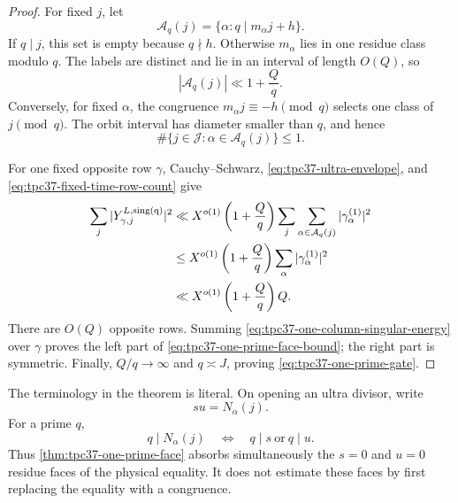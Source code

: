 \begin{proof}
For fixed \(j\), let
\begin{equation}
 \mathcal A_q(j)=\{\alpha:q\mid m_\alpha j+h\}.
 \label{eq:tpc37-row-residue-set}
\end{equation}
If \(q\mid j\), this set is empty because \(q\nmid h\).  Otherwise
\(m_\alpha\) lies in one residue class modulo \(q\).  The labels are
distinct and lie in an interval of length \(O(Q)\), so
\begin{equation}
 |\mathcal A_q(j)|\ll 1+\frac Qq.
 \label{eq:tpc37-fixed-time-row-count}
\end{equation}
Conversely, for fixed \(\alpha\), the congruence
\(m_\alpha j\equiv-h\pmod q\) selects one class of \(j\pmod q\).
The orbit interval has diameter smaller than \(q\), and hence
\begin{equation}
 \#\{j\in\mathcal J:\alpha\in\mathcal A_q(j)\}\le1.
 \label{eq:tpc37-fixed-row-time-count}
\end{equation}

For one fixed opposite row \(\gamma\), Cauchy--Schwarz,
\eqref{eq:tpc37-ultra-envelope}, and
\eqref{eq:tpc37-fixed-time-row-count} give
\begin{align}
 \sum_j|Y_{\gamma,j}^{L,\rm sing(q)}|^2
 &\ll X^{o(1)}\left(1+\frac Qq\right)
 \sum_j\sum_{\alpha\in\mathcal A_q(j)}
 |\gamma_\alpha^{(1)}|^2 \notag\\
 &\le X^{o(1)}\left(1+\frac Qq\right)
 \sum_\alpha|\gamma_\alpha^{(1)}|^2 \notag\\
 &\ll X^{o(1)}\left(1+\frac Qq\right)Q.
 \label{eq:tpc37-one-column-singular-energy}
\end{align}
There are \(O(Q)\) opposite rows.  Summing
\eqref{eq:tpc37-one-column-singular-energy} over \(\gamma\) proves the
left part of \eqref{eq:tpc37-one-prime-face-bound}; the right part is
symmetric.  Finally, \(Q/q\to\infty\) and \(q\asymp J\), proving
\eqref{eq:tpc37-one-prime-gate}.
\end{proof}

The terminology in the theorem is literal.  On opening an ultra divisor,
write
\begin{equation}
 su=N_\alpha(j).
 \label{eq:tpc37-complementary-factorization}
\end{equation}
For a prime \(q\),
\begin{equation}
 q\mid N_\alpha(j)
 \quad\Longleftrightarrow\quad
 q\mid s\ \text{or}\ q\mid u.
 \label{eq:tpc37-zero-face-equivalence}
\end{equation}
Thus \cref{thm:tpc37-one-prime-face} absorbs simultaneously the
\(s=0\) and \(u=0\) residue faces of the physical equality.  It does not
estimate these faces by first replacing the equality with a congruence.

